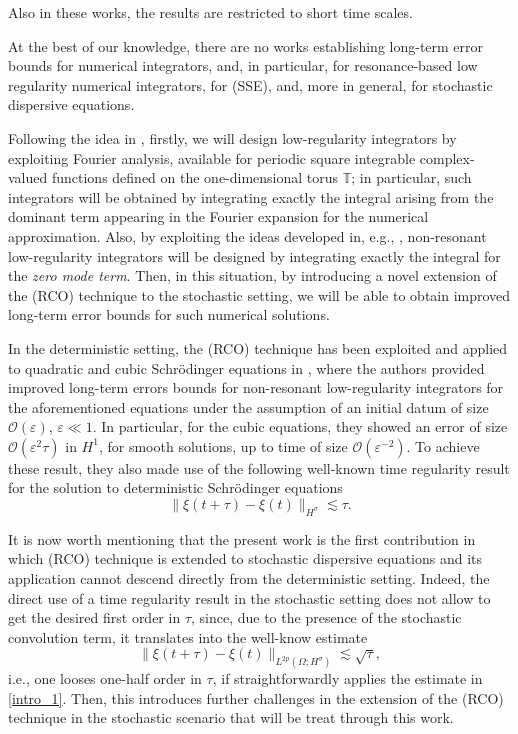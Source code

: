 \documentclass[a4paper]{amsart}
\begin{document}
Also in these works, the results are restricted to short time scales.

At the best of our knowledge, there are no works establishing long-term error bounds for numerical integrators, and, in particular, for resonance-based low regularity numerical integrators, for (SSE), and, more in general, for stochastic dispersive equations. 

Following the idea in \cite{os_ka}, firstly, we will design low-regularity integrators by exploiting Fourier analysis, available for periodic square integrable complex-valued functions defined on the one-dimensional torus $\mathbb{T}$; in particular, such integrators will be obtained by integrating exactly the integral arising from the dominant term appearing in the Fourier expansion for the numerical approximation. Also, by exploiting the ideas developed in, e.g., \cite{bao}, non-resonant low-regularity integrators will be designed by integrating exactly the integral for the {\em zero mode term}. Then, in this situation, by introducing a novel extension of the (RCO) technique to the stochastic setting, we will be able to obtain improved long-term error bounds for such numerical solutions.

In the deterministic setting, the (RCO) technique has been exploited and applied to quadratic and cubic Schrödinger equations in \cite{fe_ka}, where the authors provided improved long-term errors bounds for non-resonant low-regularity integrators for the aforementioned equations under the assumption of an initial datum of size $\mathcal{O}(\varepsilon)$, $\varepsilon\ll 1$. In particular, for the cubic equations, they showed an error of size $\mathcal{O}(\varepsilon^2\tau)$ in $H^1$, for smooth solutions, up to time of size $\mathcal{O}(\varepsilon^{-2})$. To achieve these result, they also made use of the following well-known time regularity result for the solution to deterministic Schrödinger equations
\begin{equation}
    \label{intro_0}
    \|\xi(t+\tau)-  \xi(t)\|_{H^\sigma}\lesssim\tau.
\end{equation}

It is now worth mentioning that the present work is the first contribution in which (RCO) technique  is extended to stochastic dispersive equations and its application cannot descend directly from the deterministic setting. Indeed, the direct use of a time regularity result in the stochastic setting does not allow to get the desired first order in $\tau$, since, due to the presence of the stochastic convolution term, it translates into the well-know estimate
\begin{equation}
    \label{intro_1}
    \|\xi(t+\tau)- \xi(t)\|_{L^{2p}(\Omega; H^\sigma)}\lesssim\sqrt{\tau},
\end{equation}
i.e., one looses one-half order in $\tau$, if straightforwardly applies the estimate in \eqref{intro_1}.
Then, this introduces further challenges in the extension of the (RCO) technique in the stochastic scenario that will be treat through this work.
\end{document}
